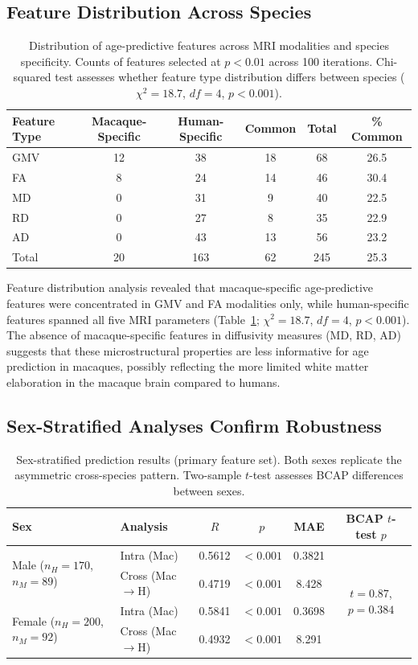 \documentclass[11pt]{article}
\begin{document}
\subsection{Feature Distribution Across Species}

\begin{table}[H]
\centering
\caption{Distribution of age-predictive features across MRI modalities and species specificity. Counts of features selected at $p < 0.01$ across 100 iterations. Chi-squared test assesses whether feature type distribution differs between species ($\chi^2 = 18.7$, $df = 4$, $p < 0.001$).}
\label{tab:features}
\begin{tabular}{lccccc}
\toprule
Feature Type & Macaque-Specific & Human-Specific & Common & Total & \% Common \\
\midrule
GMV & 12 & 38 & 18 & 68 & 26.5 \\
FA & 8 & 24 & 14 & 46 & 30.4 \\
MD & 0 & 31 & 9 & 40 & 22.5 \\
RD & 0 & 27 & 8 & 35 & 22.9 \\
AD & 0 & 43 & 13 & 56 & 23.2 \\
\midrule
Total & 20 & 163 & 62 & 245 & 25.3 \\
\bottomrule
\end{tabular}
\end{table}

Feature distribution analysis revealed that macaque-specific age-predictive features were concentrated in GMV and FA modalities only, while human-specific features spanned all five MRI parameters (Table~\ref{tab:features}; $\chi^2 = 18.7$, $df = 4$, $p < 0.001$). The absence of macaque-specific features in diffusivity measures (MD, RD, AD) suggests that these microstructural properties are less informative for age prediction in macaques, possibly reflecting the more limited white matter elaboration in the macaque brain compared to humans.

\subsection{Sex-Stratified Analyses Confirm Robustness}

\begin{table}[H]
\centering
\caption{Sex-stratified prediction results (primary feature set). Both sexes replicate the asymmetric cross-species pattern. Two-sample $t$-test assesses BCAP differences between sexes.}
\label{tab:sex}
\begin{tabular}{llcccc}
\toprule
Sex & Analysis & $R$ & $p$ & MAE & BCAP $t$-test $p$ \\
\midrule
\multirow{2}{*}{Male ($n_H = 170$, $n_M = 89$)} & Intra (Mac) & 0.5612 & $< 0.001$ & 0.3821 & \multirow{4}{*}{$t = 0.87$, $p = 0.384$} \\
 & Cross (Mac$\to$H) & 0.4719 & $< 0.001$ & 8.428 & \\
\multirow{2}{*}{Female ($n_H = 200$, $n_M = 92$)} & Intra (Mac) & 0.5841 & $< 0.001$ & 0.3698 & \\
 & Cross (Mac$\to$H) & 0.4932 & $< 0.001$ & 8.291 & \\
\bottomrule
\end{tabular}
\end{table}
\end{document}
